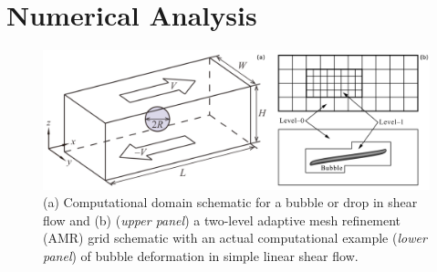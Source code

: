 \documentclass[%
 reprint,
 showkeys,
 amsmath,amssymb,
 aps,
 prfluids,
 onecolumn
]{revtex4-2}
\begin{document}
\section{Numerical Analysis}
% 
\begin{figure}%
  \centering
  \includegraphics[width=\textwidth]{SchematicAndGrid}
  \caption{(a) Computational domain schematic for a bubble or drop in shear 
           flow and (b) (\textit{upper panel}) a two-level adaptive mesh 
           refinement (AMR) grid schematic with an actual computational 
           example (\textit{lower panel}) of bubble deformation in simple linear 
           shear flow.}
  \label{fig:SchemAndGrid}
\end{figure}
%
\end{document}
